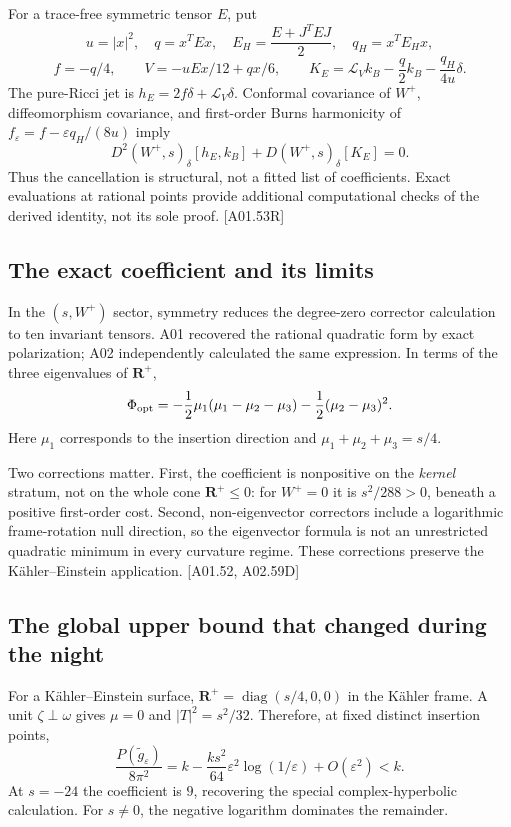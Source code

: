 \documentclass[11pt]{article}
\newcommand{\Rplus}{\mathbf R^+}
\newcommand{\sref}[1]{\textsf{[#1]}}
\theoremstyle{remark}
\begin{document}
For a trace-free symmetric tensor $E$, put
\[
 u=|x|^2,\quad q=x^TEx,\quad
 E_H=\frac{E+J^TEJ}{2},\quad q_H=x^TE_Hx,
\]
\[
 f=-q/4,\qquad V=-uEx/12+qx/6,\qquad
 K_E=\mathcal L_Vk_B-\frac q2k_B-\frac{q_H}{4u}\delta.
\]
The pure-Ricci jet is $h_E=2f\delta+\mathcal L_V\delta$.
Conformal covariance of $W^+$, diffeomorphism covariance, and first-order
Burns harmonicity of $f_\varepsilon=f-\varepsilon q_H/(8u)$ imply
\[
 D^2(W^+,s)_\delta[h_E,k_B]+D(W^+,s)_\delta[K_E]=0.
\]
Thus the cancellation is structural, not a fitted list of coefficients.
Exact evaluations at rational points provide additional computational checks
of the derived identity, not its sole proof. \sref{A01.53R}

\subsection{The exact coefficient and its limits}
In the $(s,W^+)$ sector, symmetry reduces the degree-zero corrector calculation
to ten invariant tensors. A01 recovered the rational quadratic form by exact
polarization; A02 independently calculated the same expression. In terms of
the three eigenvalues of $\Rplus$,
\[
 \Phi_{\rm opt}
 =-\frac12\mu_1(\mu_1-\mu_2-\mu_3)
  -\frac12(\mu_2-\mu_3)^2.
\]
Here $\mu_1$ corresponds to the insertion direction and
$\mu_1+\mu_2+\mu_3=s/4$.

Two corrections matter. First, the coefficient is nonpositive on the
\emph{kernel} stratum, not on the whole cone $\Rplus\le0$:
for $W^+=0$ it is $s^2/288>0$, beneath a positive first-order cost.
Second, non-eigenvector correctors include a logarithmic frame-rotation null
direction, so the eigenvector formula is not an unrestricted quadratic
minimum in every curvature regime. These corrections preserve the
K\"ahler--Einstein application. \sref{A01.52, A02.59D}

\subsection{The global upper bound that changed during the night}
For a K\"ahler--Einstein surface,
$\Rplus=\operatorname{diag}(s/4,0,0)$ in the K\"ahler frame. A unit
$\zeta\perp\omega$ gives $\mu=0$ and $|T|^2=s^2/32$. Therefore, at fixed
distinct insertion points,
\begin{equation}
 \frac{P(\widetilde g_\varepsilon)}{8\pi^2}
 =k-\frac{ks^2}{64}\varepsilon^2\log(1/\varepsilon)
   +O(\varepsilon^2)<k.\label{eq:generalke}
\end{equation}
At $s=-24$ the coefficient is $9$, recovering the special complex-hyperbolic
calculation. For $s\ne0$, the negative logarithm dominates the remainder.
\end{document}

